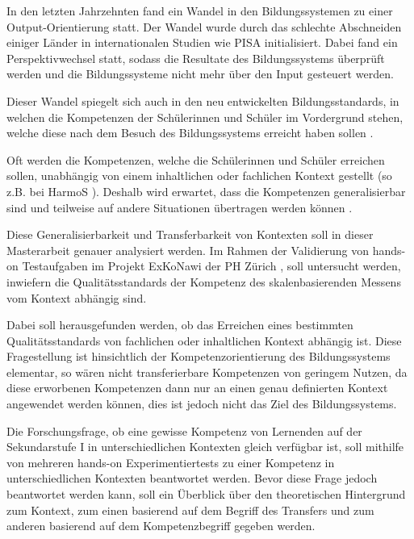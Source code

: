 

In den letzten Jahrzehnten fand ein Wandel in den Bildungssystemen zu einer Output-Orientierung statt. Der Wandel wurde durch das schlechte Abschneiden einiger Länder in internationalen Studien wie PISA \citep{PISA-KonsortiumDeuschland2004} initialisiert. Dabei fand ein Perspektivwechsel statt, sodass die Resultate des Bildungssystems überprüft werden und die Bildungssysteme nicht mehr über den Input gesteuert werden.

Dieser Wandel spiegelt sich auch in den neu entwickelten Bildungsstandards, in welchen die Kompetenzen der Schülerinnen und Schüler im Vordergrund stehen, welche diese nach dem Besuch des Bildungssystems erreicht haben sollen \citep{Oelkers2008}.

Oft werden die Kompetenzen, welche die Schülerinnen und Schüler erreichen sollen, unabhängig von einem inhaltlichen oder fachlichen Kontext gestellt (so z.B. bei HarmoS \citet{KonsotriumHarmoSNaturwissenschaften+2010}). Deshalb wird erwartet, dass die Kompetenzen generalisierbar sind und teilweise auf andere Situationen übertragen werden können \citep{Hartig2006}.

Diese Generalisierbarkeit und Transferbarkeit von Kontexten soll in dieser Masterarbeit genauer analysiert werden. Im Rahmen der Validierung von hands-on Testaufgaben im Projekt ExKoNawi der PH Zürich \citep{Metzger2013}, soll untersucht werden, inwiefern die Qualitätsstandards der Kompetenz des skalenbasierenden Messens vom Kontext abhängig sind. 

Dabei soll herausgefunden werden, ob das Erreichen eines bestimmten Qualitätsstandards von fachlichen oder inhaltlichen Kontext abhängig ist. Diese Fragestellung ist hinsichtlich der Kompetenzorientierung des Bildungssystems elementar, so wären nicht transferierbare Kompetenzen von geringem Nutzen, da diese erworbenen Kompetenzen dann nur an einen genau definierten Kontext angewendet werden können, dies ist jedoch nicht das Ziel des Bildungssystems.

Die Forschungsfrage, ob eine gewisse Kompetenz  von Lernenden auf der Sekundarstufe I in unterschiedlichen Kontexten gleich verfügbar ist, soll mithilfe von mehreren hands-on Experimentiertests zu einer Kompetenz in unterschiedlichen Kontexten beantwortet werden. Bevor diese Frage jedoch beantwortet werden kann, soll ein Überblick über den theoretischen Hintergrund zum Kontext, zum einen basierend auf dem Begriff des Transfers und zum anderen basierend auf dem Kompetenzbegriff gegeben werden.









